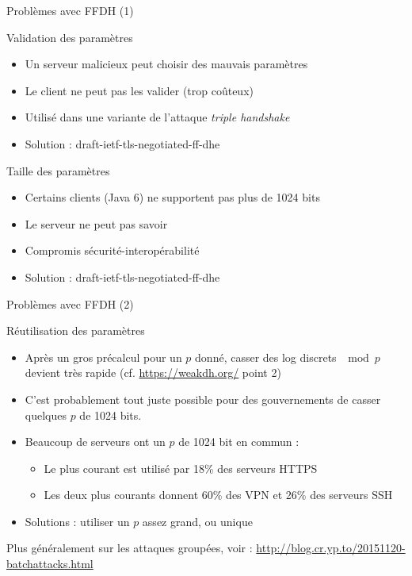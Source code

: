 \documentclass{mpg-ep-slides}
\begin{document}
\begin{frame}{Problèmes avec FFDH (1)}
  \begin{block}{Validation des paramètres}
    \begin{itemize}
      \item Un serveur malicieux peut choisir des mauvais paramètres
      \item Le client ne peut pas les valider (trop coûteux)
      \item Utilisé dans une variante de l'attaque \emph{triple handshake}
      \item Solution : draft-ietf-tls-negotiated-ff-dhe
    \end{itemize}
  \end{block}
  \begin{block}{Taille des paramètres}
    \begin{itemize}
      \item Certains clients (Java 6) ne supportent pas plus de 1024 bits
      \item Le serveur ne peut pas savoir
      \item Compromis sécurité-interopérabilité
      \item Solution : draft-ietf-tls-negotiated-ff-dhe
    \end{itemize}
  \end{block}
\end{frame}

\begin{frame}{Problèmes avec FFDH (2)}
  \begin{block}{Réutilisation des paramètres}
    \begin{itemize}
      \item Après un gros précalcul pour un $p$ donné, casser des log discrets
        $\mod p$ devient très rapide (cf. \url{https://weakdh.org/} point 2)
      \item C'est probablement tout juste possible pour des gouvernements de
        casser quelques $p$ de 1024 bits.
      \item Beaucoup de serveurs ont un $p$ de 1024 bit en commun :
        \begin{itemize}
          \item Le plus courant est utilisé par 18\% des serveurs HTTPS
          \item Les deux plus courants donnent 60\% des VPN et 26\% des
            serveurs SSH
        \end{itemize}
      \item Solutions : utiliser un $p$ assez grand, ou unique
    \end{itemize}
  \end{block}
  Plus généralement sur les attaques groupées, voir :
  \url{http://blog.cr.yp.to/20151120-batchattacks.html}
\end{frame}
\end{document}
